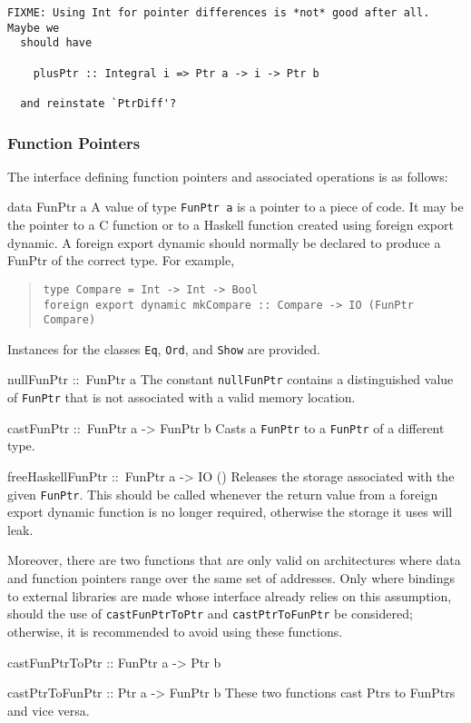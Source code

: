 \documentclass[a4paper,twosides]{article}
\makeatletter
\newcommand{\code}[1]{\texttt{#1}}      %
\newenvironment{codedesc}{%
  \list{}{\labelwidth\z@
    \let\makelabel\codedesclabel}
  }{%
  \endlist
  }
\newcommand*{\codedesclabel}[1]{%
  \hspace{-\leftmargin}
  \parbox[b]{\labelwidth}{\makebox[0pt][l]{\code{#1}}\\}\hfil\relax
  }
\makeatother
\begin{document}
\begin{verbatim}
FIXME: Using Int for pointer differences is *not* good after all.  Maybe we
  should have

    plusPtr :: Integral i => Ptr a -> i -> Ptr b

  and reinstate `PtrDiff'?
\end{verbatim}

\subsubsection{Function Pointers}

The interface defining function pointers and associated operations is as
follows:
%
\begin{codedesc}
\item[data FunPtr a] A value of type \code{FunPtr a} is a pointer to a piece
  of code. It may be the pointer to a C function or to a Haskell function
  created using foreign export dynamic. A foreign export dynamic should
  normally be declared to produce a FunPtr of the correct type. For example,
  \begin{quote}
\begin{verbatim}
type Compare = Int -> Int -> Bool
foreign export dynamic mkCompare :: Compare -> IO (FunPtr Compare)
\end{verbatim}
  \end{quote}
  
  Instances for the classes \code{Eq}, \code{Ord}, and \code{Show} are
  provided.
\item[nullFunPtr ::\ FunPtr a] The constant \code{nullFunPtr} contains a
  distinguished value of \code{FunPtr} that is not associated with a valid
  memory location.
\item[castFunPtr ::\ FunPtr a -> FunPtr b] Casts a \code{FunPtr} to a
  \code{FunPtr} of a different type.
\item[freeHaskellFunPtr ::\ FunPtr a -> IO ()] Releases the storage associated
  with the given \code{FunPtr}. This should be called whenever the return
  value from a foreign export dynamic function is no longer required,
  otherwise the storage it uses will leak.
\end{codedesc}

Moreover, there are two functions that are only valid on architectures where
data and function pointers range over the same set of addresses.  Only where
bindings to external libraries are made whose interface already relies on this
assumption, should the use of \code{castFunPtrToPtr} and
\code{castPtrToFunPtr} be considered; otherwise, it is recommended to avoid
using these functions.
%
\begin{codedesc}
\item[castFunPtrToPtr :: FunPtr a -> Ptr b]
\item[castPtrToFunPtr :: Ptr a -> FunPtr b] These two functions cast Ptrs to
  FunPtrs and vice versa.
\end{codedesc}
\end{document}
